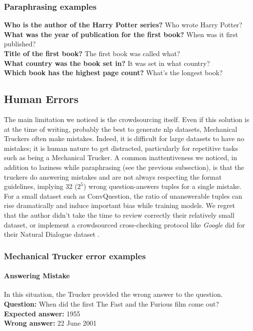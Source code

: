 \subsubsection{Paraphrasing examples}
\textbf{Who is the author of the Harry Potter series?} Who wrote Harry Potter?\\
\textbf{What was the year of publication for the first book?} When was it first published?\\
\textbf{Title of the first book?} The first book was called what?\\
\textbf{What country was the book set in?} It was set in what country?\\
\textbf{Which book has the highest page count?} What's the longest book?

\subsection{Human Errors}
\label{discussion:humans}
The main limitation we noticed is the crowdsourcing itself. Even if this solution is at the time of writing, probably the best to generate \gls{nlp} datasets, Mechanical Truckers often make mistakes. Indeed, it is difficult for large datasets to have no mistakes; it is human nature to get distracted, particularly for repetitive tasks such as being a Mechanical Trucker. A common inattentiveness we noticed, in addition to laziness while paraphrasing (see the previous subsection), is that the truckers do answering mistakes and are not always respecting the format guidelines, implying 32 ($2^5$) wrong question-answers tuples for a single mistake. For a small dataset such as ConvQuestion, the ratio of unanswerable tuples can rise dramatically and induce important bias while training models. We regret that the author didn't take the time to review correctly their relatively small dataset, or implement a crowdsourced cross-checking protocol like \textit{Google} did for their Natural Dialogue dataset \autocite{paper:google-natural-questions}. 

\subsubsection{Mechanical Trucker error examples}

\paragraph{Answering Mistake}
In this situation, the Trucker provided the wrong answer to the question. \\
\textbf{Question:} When did the first The Fast and the Furious film come out?\\
\textbf{Expected answer:} 1955\\
\textbf{Wrong answer:} 22 June 2001


